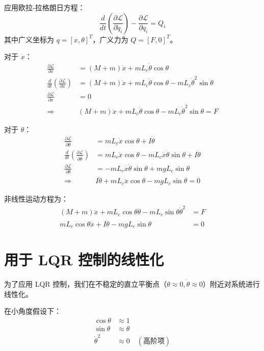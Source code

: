 \documentclass[a4paper,12pt]{article}
\begin{document}
应用欧拉-拉格朗日方程：
\begin{equation}
    \frac{d}{dt}\left( \frac{\partial \mathcal{L}}{\partial \dot{q}_i} \right) - \frac{\partial \mathcal{L}}{\partial q_i} = Q_i
\end{equation}
其中广义坐标为 $q = [x, \theta]^T$，广义力为 $Q = [F, 0]^T$。

对于 $x$：
\begin{align}
    \frac{\partial \mathcal{L}}{\partial \dot{x}} &= (M + m)\dot{x} + m L_c \dot{\theta} \cos\theta \\
    \frac{d}{dt}\left( \frac{\partial \mathcal{L}}{\partial \dot{x}} \right) &= (M + m)\ddot{x} + m L_c \ddot{\theta} \cos\theta - m L_c \dot{\theta}^2 \sin\theta \\
    \frac{\partial \mathcal{L}}{\partial x} &= 0 \\
    \Rightarrow \quad &(M + m)\ddot{x} + m L_c \ddot{\theta} \cos\theta - m L_c \dot{\theta}^2 \sin\theta = F \label{eq:cart}
\end{align}

对于 $\theta$：
\begin{align}
    \frac{\partial \mathcal{L}}{\partial \dot{\theta}} &= m L_c \dot{x} \cos\theta + I \dot{\theta} \\
    \frac{d}{dt}\left( \frac{\partial \mathcal{L}}{\partial \dot{\theta}} \right) &= m L_c \ddot{x} \cos\theta - m L_c \dot{x} \dot{\theta} \sin\theta + I \ddot{\theta} \\
    \frac{\partial \mathcal{L}}{\partial \theta} &= -m L_c \dot{x} \dot{\theta} \sin\theta + m g L_c \sin\theta \\
    \Rightarrow \quad &I\ddot{\theta} + m L_c \ddot{x} \cos\theta - m g L_c \sin\theta = 0 \label{eq:pole}
\end{align}

非线性运动方程为：
\begin{align}
    (M + m)\ddot{x} + m L_c \cos\theta \ddot{\theta} - m L_c \sin\theta \dot{\theta}^2 &= F \\
    m L_c \cos\theta \ddot{x} + I\ddot{\theta} - m g L_c \sin\theta &= 0
\end{align}

\section{用于 LQR 控制的线性化}
为了应用 LQR 控制，我们在不稳定的直立平衡点（$\theta \approx 0, \dot{\theta} \approx 0$）附近对系统进行线性化。

在小角度假设下：
\begin{align*}
    \cos\theta &\approx 1 \\
    \sin\theta &\approx \theta \\
    \dot{\theta}^2 &\approx 0 \quad (\text{高阶项})
\end{align*}
\end{document}
